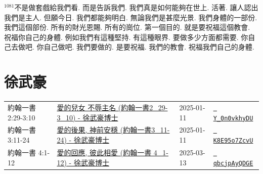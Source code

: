 \documentclass{book}
\begin{document}
$^{1081}$不是做套戲給我們看.
而是告訴我們.
我們真是如何能夠在世上.
活著.
讓人認出我們是主人.
但願今日.
我們都能夠明白.
無論我們是甚麼光景.
我們身體的一部份.
我們這個部份.
所有的財光恩賜.
所有的崗位.
第一個目的.
就是要祝福這個教會.
祝福你自己的身體.
例如我們有這種堅持.
有這種眼界.
要做多少方面都需要.
你自己去做吧.
你自己做吧.
我們要做的.
是要祝福.
我們的教會.
祝福我們自己的身體.
\newpage



\chapter{徐武豪}\label{ch:preacher4}
\begin{multicols}{3}
\minitoc
\end{multicols}
{ \scriptsize


\begin{xltabular}{\textwidth}{|p{0.15\textwidth} p{0.6\textwidth}|p{0.07\textwidth} p{0.1\textwidth}|}
\hline
約翰一書 2:29-3:10 & \hyperref[sec:Y_0n0vkhyDU]{愛的兒女 不辱主名 (約翰一書2\_29-3\_10) - 徐武豪博士} & 2025-01-11 & \href{https://youtube.com/watch?v=Y_0n0vkhyDU}{\texttt{ Y\_0n0vkhyDU}} \\
約翰一書 3:11-24 & \hyperref[sec:K8E95o7ZcvU]{愛的後果, 神前安穩 (約翰一書3\_11-24) - 徐武豪博士} & 2025-01-11 & \href{https://youtube.com/watch?v=K8E95o7ZcvU}{\texttt{ K8E95o7ZcvU}} \\
約翰一書 4:1-12 & \hyperref[sec:qbcjpAyQDGE]{愛的回應, 彼此相愛 (約翰一書 4\_1-12) - 徐武豪博士} & 2025-03-13 & \href{https://youtube.com/watch?v=qbcjpAyQDGE}{\texttt{ qbcjpAyQDGE}} \\
\hline
\end{xltabular}
}
\newpage
\end{document}
